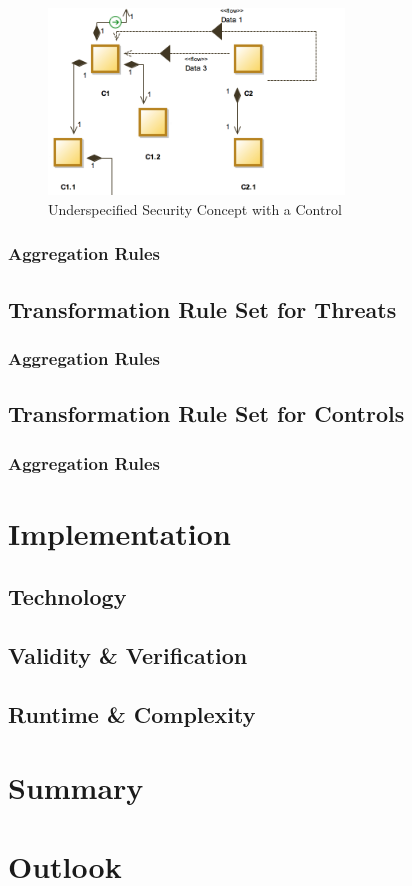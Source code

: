 \begin{figure}[H]
\centering
\includegraphics[width=0.7\textwidth]{pictures/con_c2}
\caption{Underspecified Security Concept with a Control}
\label{fig:con_c2}
\end{figure} 


\subsubsection{Aggregation Rules}
\subsection{Transformation Rule Set for Threats}
\label{subsec:threat_rules}
\subsubsection{Aggregation Rules}
\subsection{Transformation Rule Set for Controls}
\subsubsection{Aggregation Rules}

\section{Implementation}
\subsection{Technology}
\subsection{Validity \& Verification}
\label{subsec:validation}
\subsection{Runtime \& Complexity}

\section{Summary}
\section{Outlook}
\label{subsec:secgoal}